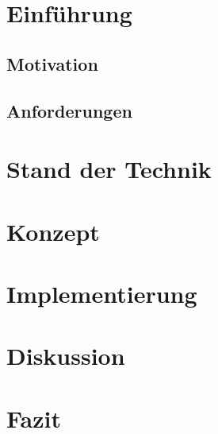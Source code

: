\documentclass[11pt,a4paper]{scrartcl}
\begin{document}
	
	
	\tableofcontents
	\newpage
 	
 	\section{Einführung}\label{sec:introduction}
	\subsection{Motivation}\label{subsec:motivation}
	\subsection{Anforderungen}\label{subsec:anforderungen}
	\section{Stand der Technik}\label{sec:state-of-the-art}
	\section{Konzept}\label{sec:konzept}
	\section{Implementierung}\label{sec:implementierung}
	\section{Diskussion}\label{sec:diskussion}
	\section{Fazit}\label{sec:fazit}

	\newpage
 	
 	\listoffigures
\end{document}
